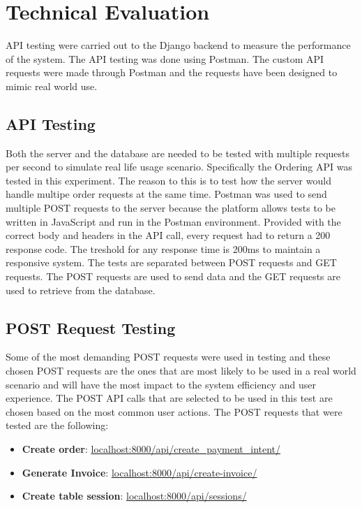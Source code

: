 \section{Technical Evaluation}
API testing were carried out to the Django backend to measure the performance of the system. The API testing was done using Postman. The custom API requests were made through Postman and the requests have been designed to mimic real world use.

\subsection{API Testing}
Both the server and the database are needed to be tested with multiple requests per second to simulate real life usage scenario. Specifically the Ordering API was tested in this experiment. The reason to this is to test how the server would handle multipe order requests at the same time. Postman was used to send multiple POST requests to the server because the platform allows tests to be written in JavaScript and run in the Postman environment. Provided with the correct body and headers in the API call, every request had to return a 200 response code. The treshold for any response time is 200ms to maintain a responsive system. The tests are separated between POST requests and GET requests. The POST requests are used to send data and the GET requests are used to retrieve from the database.

\subsection{POST Request Testing}
Some of the most demanding POST requests were used in testing and these chosen POST requests are the ones that are most likely to be used in a real world scenario and will have the most impact to the system efficiency and user experience. The POST API calls that are selected to be used in this test are chosen based on the most common user actions. The POST requests that were tested are the following:

    \begin{itemize}
        \item \textbf{Create order}: \url{localhost:8000/api/create_payment_intent/}
        \item \textbf{Generate Invoice}: \url{localhost:8000/api/create-invoice/}
        \item \textbf{Create table session}: \url{localhost:8000/api/sessions/}
    \end{itemize}


